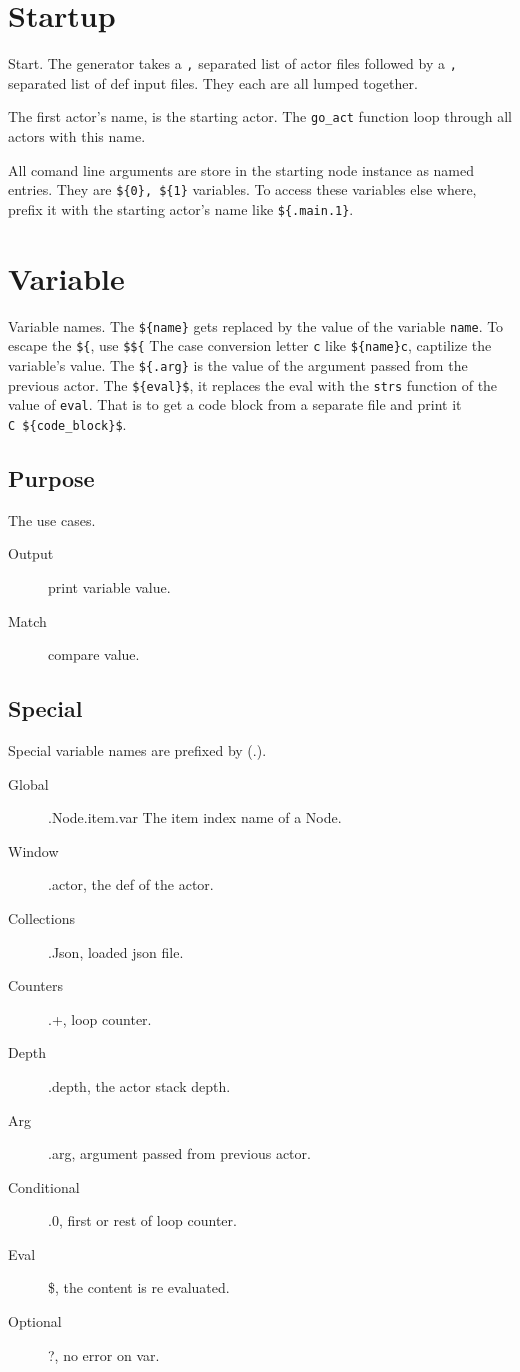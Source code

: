 \documentclass[11pt]{article}
\begin{document}
\section{Startup}
Start.
The generator takes a \texttt{,} separated list of actor files followed
by a \texttt{,} separated list of def input files. They each are all
lumped together.

The first actor's name, is the starting actor. The \texttt{go\_act}
function loop through all actors with this name.

All comand line arguments are store in the starting node instance as
named entries. They are \texttt{\$\{0\},\ \$\{1\}} variables. To access
these variables else where, prefix it with the starting actor's name
like \texttt{\$\{.main.1\}}.
\section{Variable}
Variable names.
The \texttt{\$\{name\}} gets replaced by the value of the variable
\texttt{name}. To escape the \texttt{\$\{}, use \texttt{\$\$\{} The case
conversion letter \texttt{c} like \texttt{\$\{name\}c}, captilize the
variable's value. The \texttt{\$\{.arg\}} is the value of the argument
passed from the previous actor. The \texttt{\$\{eval\}\$}, it replaces
the eval with the \texttt{strs} function of the value of \texttt{eval}.
That is to get a code block from a separate file and print it
\texttt{C\ \$\{code\_block\}\$}.
\subsection{Purpose}
The use cases.
\begin{description}
\item[Output]  print variable value.
\item[Match]  compare value.
\end{description}
\subsection{Special}
Special variable names are prefixed by (.).
\begin{description}
\item[Global]  .Node.item.var The item index name of a Node.
\item[Window]  .actor, the def of the actor.
\item[Collections]  .Json, loaded json file.
\item[Counters]  .+, loop counter.
\item[Depth]  .depth, the actor stack depth.
\item[Arg]  .arg, argument passed from previous actor.
\item[Conditional]  .0, first or rest of loop counter.
\item[Eval]  \$, the content is re evaluated.
\item[Optional]  ?, no error on var.
\end{description}
\end{document}
